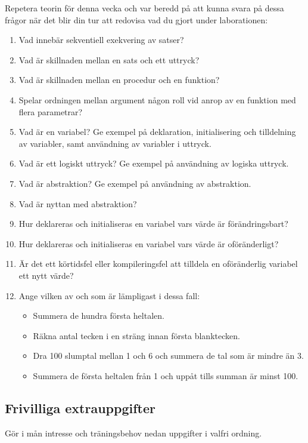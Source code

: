 \noindent Repetera teorin för denna vecka och var beredd på att kunna svara på dessa frågor när det blir din tur att redovisa vad du gjort under laborationen:

\begin{enumerate}
\item Vad innebär sekventiell exekvering av satser?
\item Vad är skillnaden mellan en sats och ett uttryck?
\item Vad är skillnaden mellan en procedur och en funktion?
\item Spelar ordningen mellan argument någon roll vid anrop av en funktion med flera parametrar?
\item Vad är en variabel? Ge exempel på deklaration, initialisering och tilldelning av variabler, samt användning av variabler i uttryck.
\item Vad är ett logiskt uttryck? Ge exempel på användning av logiska uttryck.
\item Vad är abstraktion? Ge exempel på användning av abstraktion.
\item Vad är nyttan med abstraktion?
\item Hur deklareras och initialiseras en variabel vars värde är förändringsbart?
\item Hur deklareras och initialiseras en variabel vars värde är oföränderligt?
\item Är det ett körtidsfel eller kompileringsfel att tilldela en oföränderlig variabel ett nytt värde?
\item Ange vilken av  och  som är lämpligast i dessa fall:
\begin{itemize}[noitemsep, nolistsep]
\item[A.] Summera de hundra första heltalen.
\item[B.] Räkna antal tecken i en sträng innan första blanktecken.
\item[C.] Dra 100 slumptal mellan 1 och 6 och summera de tal som är mindre än 3.
\item[D.] Summera de första heltalen från 1 och uppåt tills summan är minst 100.
\end{itemize}
\end{enumerate}


\subsection{Frivilliga extrauppgifter}

\noindent Gör i mån intresse och träningsbehov nedan uppgifter i valfri ordning.

